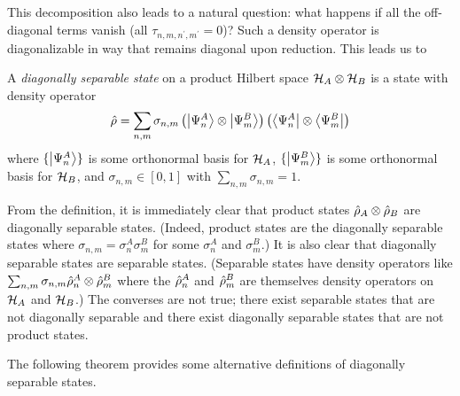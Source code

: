 This decomposition also leads to a natural question: what happens if all the off-diagonal terms vanish (all \(\tau_{n,m,n^\prime,m^\prime}=0\))? Such a density operator is diagonalizable in way that remains diagonal upon reduction. This leads us to

\begin{definition}\label{def.diagsep}
A \emph{diagonally separable state} on a product Hilbert space \(\mathcal{H}_A \otimes \mathcal{H}_B\) is a state with density operator
\begin{equation}\label{eq.defdiagsep}
\hat{\rho} = \sum_{n,m} \sigma_{n,m} \left(\left|\Psi_n^A\right\rangle\otimes\left|\Psi_m^B\right\rangle\right)\left(\left\langle\Psi_n^A\right|\otimes\left\langle\Psi_m^B\right|\right)
\end{equation}
where \(\{\left|\Psi_n^A\right\rangle\}\) is some orthonormal basis for \(\mathcal{H}_A\), \(\{\left|\Psi_m^B\right\rangle\}\) is some orthonormal basis for \(\mathcal{H}_B\), and \(\sigma_{n,m}\in[0,1]\) with \(\sum_{n,m}\sigma_{n,m} =1\).
\end{definition}

From the definition, it is immediately clear that product states \(\hat{\rho}_A\otimes\hat{\rho}_B\) are diagonally separable states. (Indeed, product states are the diagonally separable states where \(\sigma_{n,m} = \sigma_n^A\sigma_m^B\) for some \(\sigma_n^A\) and \(\sigma_m^B\).) It is also clear that diagonally separable states are separable states. (Separable states have density operators like \(\sum_{n,m} \sigma_{n,m} \hat{\rho}_n^A\otimes\hat{\rho}_m^B\) where the \(\hat{\rho}_n^A\) and \(\hat{\rho}_m^B\) are themselves density operators on \(\mathcal{H}_A\) and \(\mathcal{H}_B\).) The converses are not true; there exist separable states that are not diagonally separable and there exist diagonally separable states that are not product states.

The following theorem provides some alternative definitions of diagonally separable states.

